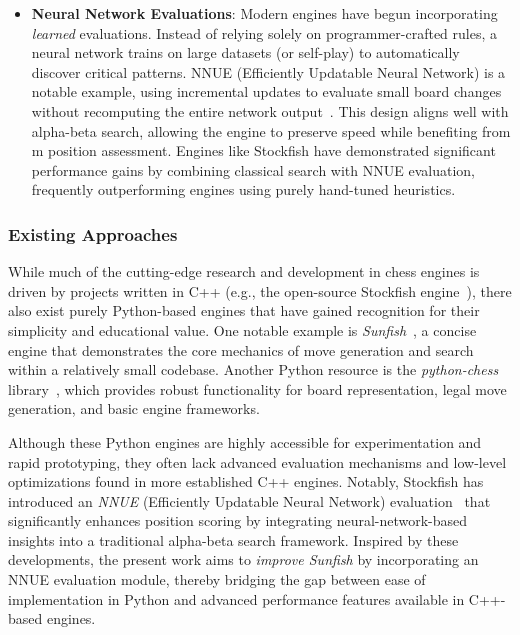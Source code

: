 \documentclass[12pt,a4paper]{article}
\begin{document}
\begin{itemize}
  \item \textbf{Neural Network Evaluations}:  
  Modern engines have begun incorporating \emph{learned} evaluations. Instead of relying solely on programmer-crafted rules, a neural network trains on large datasets (or self-play) to automatically discover critical patterns. NNUE (Efficiently Updatable Neural Network) is a notable example, using incremental updates to evaluate small board changes without recomputing the entire network output~\cite{Nasu2018}. This design aligns well with alpha-beta search, allowing the engine to preserve speed while benefiting from m position assessment. Engines like Stockfish have demonstrated significant performance gains by combining classical search with NNUE evaluation, frequently outperforming engines using purely hand-tuned heuristics.
\end{itemize}


    \subsubsection{Existing Approaches}
\label{subsec:existing-approaches}

While much of the cutting-edge research and development in chess engines is
driven by projects written in C++ (e.g., the open-source Stockfish
engine~\cite{stockfish}), there also exist purely Python-based engines that
have gained recognition for their simplicity and educational value. One notable
example is \emph{Sunfish}~\cite{sunfish}, a concise engine that demonstrates the
core mechanics of move generation and search within a relatively small codebase.
Another Python resource is the \emph{python-chess} library~\cite{python-chess},
which provides robust functionality for board representation, legal move
generation, and basic engine frameworks.

Although these Python engines are highly accessible for experimentation and
rapid prototyping, they often lack advanced evaluation mechanisms and
low-level optimizations found in more established C++ engines. Notably,
Stockfish has introduced an \emph{NNUE} (Efficiently Updatable Neural Network)
evaluation~\cite{nnue-stockfish} that significantly enhances position scoring
by integrating neural-network-based insights into a traditional alpha-beta
search framework. Inspired by these developments, the present work aims to
\emph{improve Sunfish} by incorporating an NNUE evaluation module, thereby
bridging the gap between ease of implementation in Python and advanced
performance features available in C++-based engines.
\end{document}
